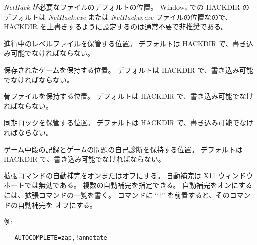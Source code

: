 \item[\bb{HACKDIR}]
{\it NetHack\/} が必要なファイルのデフォルトの位置。
Windows での HACKDIR のデフォルトは {\it NetHack.exe\/} または
{\it NetHackw.exe\/} ファイルの位置なので、
HACKDIR を上書きするように設定するのは通常不要で非推奨である。
\item[\bb{LEVELDIR}]
進行中のレベルファイルを保管する位置。
デフォルトは HACKDIR で、書き込み可能でなければならない。
\item[\bb{SAVEDIR}]
保存されたゲームを保持する位置。
デフォルトは HACKDIR で、書き込み可能でなければならない。
\item[\bb{BONESDIR}]
骨ファイルを保持する位置。
デフォルトは HACKDIR で、書き込み可能でなければならない。
\item[\bb{LOCKDIR}]
同期ロックを保管する位置。
デフォルトは HACKDIR で、書き込み可能でなければならない。
\item[\bb{TROUBLEDIR}]
ゲーム中段の記録とゲームの問題の自己診断を保持する位置。
デフォルトは HACKDIR で、書き込み可能でなければならない。
\item[\bb{AUTOCOMPLETE}]
拡張コマンドの自動補完をオンまたはオフにする。
自動補完は X11 ウィンドウポートでは無効である。
複数の自動補完を指定できる。
自動補完をオンにするには、拡張コマンドの一覧を書く。
コマンドに ``{{\tt !}}'' を前置すると、そのコマンドの自動補完を
オフにする。

例:
\begin{verbatim}
   AUTOCOMPLETE=zap,!annotate
\end{verbatim}

